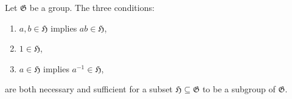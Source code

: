 Let $\mathfrak{G}$ be a group. The three conditions:
\begin{enumerate}
\item $a, b \in \mathfrak{H}$ implies $ab \in \mathfrak{H}$,
\item $1 \in \mathfrak{H}$,
\item $a \in \mathfrak{H}$ implies $a^{-1} \in \mathfrak{H}$,
\end{enumerate}
are both necessary and sufficient for a subset $\mathfrak{H} \subseteq \mathfrak{G}$ to be a subgroup of $\mathfrak{G}$.
